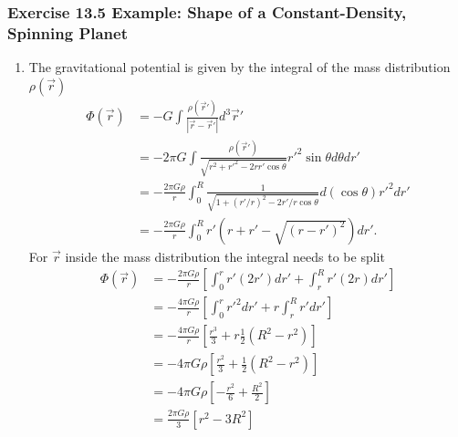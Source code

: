 \documentclass[10pt,a4paper]{article}
\theoremstyle{definition}
\begin{document}
\subsubsection{Exercise 13.5 Example: Shape of a Constant-Density, Spinning Planet}
\begin{enumerate}[label=(\alph*)]
\item The gravitational potential is given by the integral of the mass distribution $\rho(\vec{r})$
\begin{align}
    \Phi(\vec{r})
    &=-G\int\frac{\rho(\vec{r}')}{|\vec{r}-\vec{r}'|}d^3\vec{r}'\\
    &=-2\pi G\int\frac{\rho(\vec{r}')}{\sqrt{r^2+{r'}^2-2rr'\cos\theta}}r'^2\sin\theta d\theta dr'\\
    &=-\frac{2\pi G\rho}{r}\int_0^R\frac{1}{\sqrt{1+(r'/r)^2-2r'/r\cos\theta}}d(\cos\theta) r'^2dr'\\
    &=-\frac{2\pi G\rho}{r}\int_0^Rr'\left(r+r'-\sqrt{(r-r')^2}\right)dr'.
\end{align}
For $\vec{r}$ inside the mass distribution the integral needs to be split
\begin{align}
    \Phi(\vec{r})
    &=-\frac{2\pi G\rho}{r}\left[\int_0^rr'\left(2r'\right)dr'+\int_r^Rr'\left(2r\right)dr'\right]\\
    &=-\frac{4\pi G\rho}{r}\left[\int_0^rr'^2dr'+r\int_r^Rr'dr'\right]\\
    &=-\frac{4\pi G\rho}{r}\left[\frac{r^3}{3}+r\frac{1}{2}(R^2-r^2)\right]\\
    &=-4\pi G\rho\left[\frac{r^2}{3}+\frac{1}{2}(R^2-r^2)\right]\\
    &=-4\pi G\rho\left[-\frac{r^2}{6}+\frac{R^2}{2}\right]\\
    &=\frac{2\pi G\rho}{3}\left[r^2-3R^2\right]
\end{align}


\end{enumerate}
\end{document}
